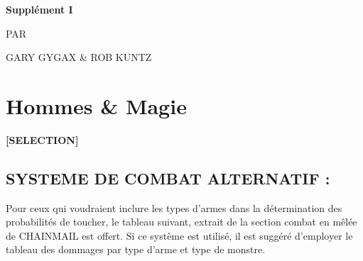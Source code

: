 \newpage
{}\begin{center}
{\Huge {}}{\normalsize \textsuperscript{\sffamily\textregistered}}

\vspace{1.8cm}

{\Large \textbf{Supplément I}}

\vspace{1.3cm}

{\Huge {}}

\vspace{5cm}

{\large PAR

\vspace{0.1cm}

GARY GYGAX \& ROB KUNTZ}
\end{center}

\newpage
\phantom{-}
\newpage


\section*{Hommes \& Magie}

\begin{center}
\textbf{[SELECTION]}
\end{center}

\subsection*{SYSTEME DE COMBAT ALTERNATIF :}
\label{combat-alternatif}

Pour ceux qui voudraient inclure les types d'armes dans la détermination des probabilités de toucher, le tableau suivant, extrait de la section \og combat en mêlée \fg{} de CHAINMAIL est offert. Si ce système est utilisé, il est suggéré d'employer le tableau des dommages par type d'arme et type de monstre.

